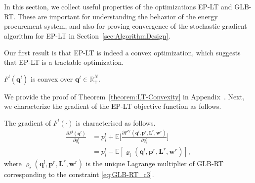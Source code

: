 \section{}
\label{sec:characterizingOptima}

In this section, we collect useful properties of the optimizations
EP-LT and GLB-RT. These are important for understanding the behavior
of the energy procurement system, and also for proving convergence of
the stochastic gradient algorithm for EP-LT in
Section~\ref{sec:AlgorithmDesign}.



\label{sec:char_ep-lt}

Our first result is that EP-LT is indeed a convex optimization, which
suggests that EP-LT is a tractable optimization.


\begin{theorem}
	\label{theorem:LT-Convexity}
	$F^l(\textbf{q}^l)$ is convex over $\textbf{q}^l \in \mathbb{R}^N_+.$
\end{theorem}
We provide the proof of Theorem~\ref{theorem:LT-Convexity} in Appendix~. Next, we characterize the gradient of the EP-LT objective function as
follows.

\begin{theorem}
	\label{theorem:lt_gradient}
	The gradient of $F^l(\cdot)$ is characterised as follows.
	\begin{align*}
	\frac{\partial F^l(\textbf{q}^l)} {\partial q^l_i} &= p^l_i +
	\mathbb{E} \bigg[ \frac{\partial F^{*r}(\textbf{q}^l,\textbf{p}^r,\textbf{L}^r,\textbf{w}^r)}  {\partial q^l_i} \bigg] \\
	&=p^l_i -\mathbb{E}
	\left[\varrho_i(\textbf{q}^l,\textbf{p}^r,\textbf{L}^r,\textbf{w}^r)
	\right],
	\end{align*}    
	where $\varrho_i(\textbf{q}^l,\textbf{p}^r,\textbf{L}^r,\textbf{w}^r)$
	is the unique Lagrange multiplier of GLB-RT corresponding to the
	constraint \eqref{eq:GLB-RT_c3}.
\end{theorem}



